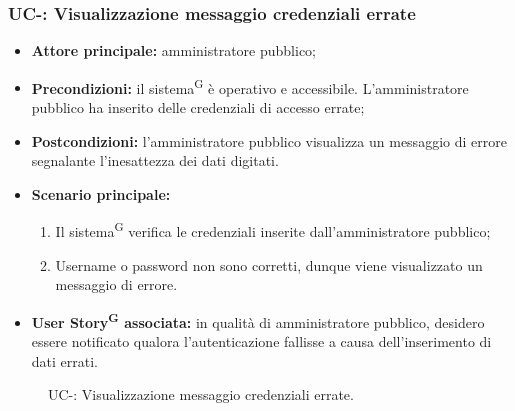 \documentclass[8pt]{article}
\newcommand{\glossterm}[1]{#1\textsuperscript{G}} %
\begin{document}
\subsubsection*{UC-\ucnumber: Visualizzazione messaggio credenziali errate}
\begin{itemize}
    \item \textbf{Attore principale:} amministratore pubblico;
    \item \textbf{Precondizioni:} il \glossterm{sistema} è operativo e accessibile. L'amministratore pubblico ha inserito delle credenziali di accesso errate;
    \item \textbf{Postcondizioni:} l'amministratore pubblico visualizza un messaggio di errore segnalante l'inesattezza dei dati digitati.
    \item \textbf{Scenario principale:} 
        \begin{enumerate}
        \item Il \glossterm{sistema} verifica le credenziali inserite dall'amministratore pubblico;
        \item Username o password non sono corretti, dunque viene visualizzato un messaggio di errore.
        \end{enumerate}
    \item \textbf{\glossterm{User Story} associata:} in qualità di amministratore pubblico, desidero essere notificato qualora l'autenticazione fallisse a causa dell'inserimento di dati errati.
\end{itemize}
\begin{figure}[ht!]
    \centering
    \caption{UC-\theuc: Visualizzazione messaggio credenziali errate.}
    \label{fig:UC-\theuc: Visualizzazione messaggio credenziali errate}
\end{figure}
\end{document}
